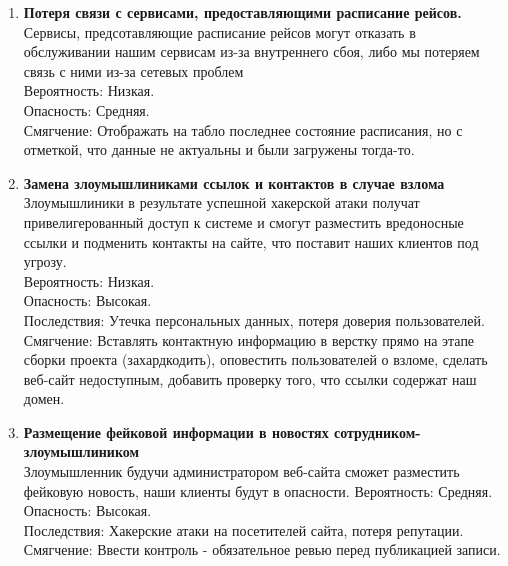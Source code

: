 
\begin{enumerate}
      \item \textbf{Потеря связи с сервисами, предоставляющими расписание рейсов.} \\
            Сервисы, предсотавляющие расписание рейсов могут отказать
            в обслуживании нашим сервисам из-за внутреннего сбоя,
            либо мы потеряем связь с ними из-за сетевых проблем \\
            Вероятность: Низкая. \\
            Опасность: Средняя. \\
            Смягчение: Отображать на табло последнее состояние расписания, но с
            отметкой, что данные не актуальны и были загружены тогда-то.

      \item \textbf{Замена злоумышлиниками ссылок и контактов в случае взлома} \\
            Злоумышлиники в результате успешной хакерской атаки получат привелигерованный
            доступ к системе и смогут разместить вредоносные ссылки и подменить контакты
            на сайте, что поставит наших клиентов под угрозу. \\
            Вероятность: Низкая. \\
            Опасность: Высокая. \\
            Последствия: Утечка персональных данных, потеря доверия пользователей. \\
            Смягчение: Вставлять контактную информацию в верстку прямо на этапе
            сборки проекта (захардкодить), оповестить пользователей о взломе,
            сделать веб-сайт недоступным, добавить проверку того, что ссылки содержат 
            наш домен.

      \item \textbf{Размещение фейковой информации в новостях сотрудником-злоумышлиником} \\
            Злоумышленник будучи администратором веб-сайта сможет разместить фейковую новость,
            наши клиенты будут в опасности.
            Вероятность: Средняя. \\
            Опасность: Высокая. \\
            Последствия: Хакерские атаки на посетителей сайта, потеря репутации. \\
            Смягчение: Ввести контроль - обязательное ревью перед публикацией записи. \\


\end{enumerate}
